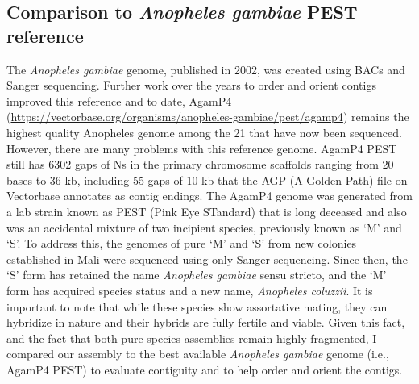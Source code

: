 




\subsection{Comparison to \textit{Anopheles gambiae} PEST reference}

\par{
The \textit{Anopheles gambiae} genome, published in 2002, was created using BACs and Sanger sequencing\cite{PEST}. Further work over the years to order and orient contigs improved this reference\cite{PEST2}\cite{heterochromatin} and to date, AgamP4 (\url{https://vectorbase.org/organisms/anopheles-gambiae/pest/agamp4}) remains the highest quality Anopheles genome among the 21 that have now been sequenced\cite{16anopheles}. However, there are many problems with this reference genome. AgamP4 PEST still has 6302 gaps of Ns in the primary chromosome scaffolds ranging from 20 bases to 36 kb, including 55 gaps of 10 kb that the AGP (A Golden Path) file on Vectorbase annotates as contig endings. The AgamP4 genome was generated from a lab strain known as PEST (Pink Eye STandard) that is long deceased and also was an accidental mixture of two incipient species, previously known as `M' and `S'. To address this, the genomes of pure `M' and `S' from new colonies established in Mali were sequenced using only Sanger sequencing\cite{anophdivergence}. Since then, the `S' form has retained the name \textit{Anopheles gambiae} sensu stricto, and the `M' form has acquired species status and a new name, \textit{Anopheles coluzzii}\cite{gambiaecomplex}. It is important to note that while these species show assortative mating, they can hybridize in nature and their hybrids are fully fertile and viable\cite{assortativemating}. Given this fact, and the fact that both pure species assemblies remain highly fragmented, I compared our assembly to the best available \textit{Anopheles gambiae} genome (i.e., AgamP4 PEST) to evaluate contiguity and to help order and orient the contigs.
} 

